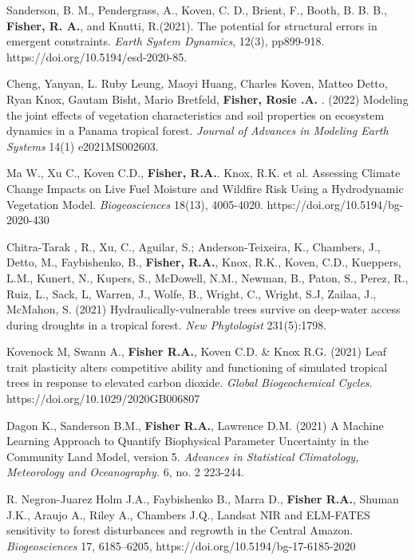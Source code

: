 \documentclass[10pt]{article}
\newenvironment{lonelist}[1][\enskip\textbullet]%
        {\vspace{-\baselineskip}\begin{list}{#1}{%
        \setlength{\itemindent}{-3pt} 
        \setlength{\partopsep}{0pt}%
        \setlength{\leftmargin}{10pt}
        \setlength{\topsep}{15pt}}}
        {\end{list}\vspace{-.3\baselineskip}}
\begin{document}
\begin{lonelist}
\item [66] Sanderson, B. M., Pendergrass, A., Koven, C. D., Brient, F., Booth, B. B. B., \textbf{Fisher, R. A.}, and Knutti, R.(2021). The potential for structural errors in emergent constraints.  \emph{Earth System Dynamics}, 12(3), pp899-918. https://doi.org/10.5194/esd-2020-85.

\item [65]  Cheng, Yanyan, L. Ruby Leung, Maoyi Huang, Charles Koven, Matteo Detto, Ryan Knox, Gautam Bisht, Mario Bretfeld, \textbf{Fisher, Rosie .A.} . (2022) Modeling the joint effects of vegetation characteristics and soil properties on ecosystem dynamics in a Panama tropical forest. \emph{Journal of Advances in Modeling Earth Systems} 14(1) e2021MS002603.

\item [64] Ma W., Xu C., Koven C.D., \textbf{Fisher, R.A.}. Knox, R.K. et al.  Assessing Climate Change Impacts on Live Fuel Moisture and Wildfire Risk Using a Hydrodynamic Vegetation Model. \emph{Biogeosciences} 18(13), 4005-4020. https://doi.org/10.5194/bg-2020-430

\item [62] Chitra-Tarak , R., Xu, C., Aguilar, S.; Anderson-Teixeira, K., Chambers, J., Detto, M., Faybishenko, B., \textbf{Fisher, R.A.}, Knox, R.K., Koven, C.D., Kueppers, L.M., Kunert, N., Kupers, S., McDowell, N.M., Newman, B., Paton, S., Perez, R., Ruiz, L., Sack, L, Warren, J., Wolfe, B., Wright, C., Wright, S.J, Zailaa, J., McMahon, S. (2021) Hydraulically-vulnerable trees survive on deep-water access during droughts in a tropical forest.  \emph{New Phytologist} 231(5):1798. 

\item [61] Kovenock M, Swann A., \textbf{Fisher R.A.}, Koven C.D. \& Knox R.G. (2021) Leaf trait plasticity alters competitive ability and functioning of simulated tropical trees in response to elevated carbon dioxide. \emph{Global Biogeochemical Cycles}. https://doi.org/10.1029/2020GB006807

\item[60]   Dagon K.,  Sanderson B.M., \textbf{Fisher R.A.}, Lawrence D.M. (2021) A Machine Learning Approach to Quantify Biophysical Parameter Uncertainty in the Community Land Model, version 5.   \emph{Advances in Statistical Climatology, Meteorology and Oceanography.} 6, no. 2 223-244.

\item [59]  R. Negron-Juarez
 Holm J.A.,  Faybishenko B.,  Marra D., \textbf{Fisher R.A.},  Shuman J.K.,  Araujo A.,  Riley A.,  Chambers J.Q., Landsat NIR and ELM-FATES sensitivity to forest disturbances and regrowth in the Central Amazon.  \emph{Biogeosciences}  17, 6185–6205,  https://doi.org/10.5194/bg-17-6185-2020
 

\end{lonelist}
\end{document}
